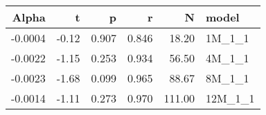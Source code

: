 \begin{table}[ht]
\centering
\begin{tabular}{rrrrrl}
  \hline
Alpha & t & p & r & N & model \\ 
  \hline
-0.0004 & -0.12 & 0.907 & 0.846 & 18.20 & 1M\_1\_1 \\ 
  -0.0022 & -1.15 & 0.253 & 0.934 & 56.50 & 4M\_1\_1 \\ 
  -0.0023 & -1.68 & 0.099 & 0.965 & 88.67 & 8M\_1\_1 \\ 
  -0.0014 & -1.11 & 0.273 & 0.970 & 111.00 & 12M\_1\_1 \\ 
   \hline
\end{tabular}
\end{table}

